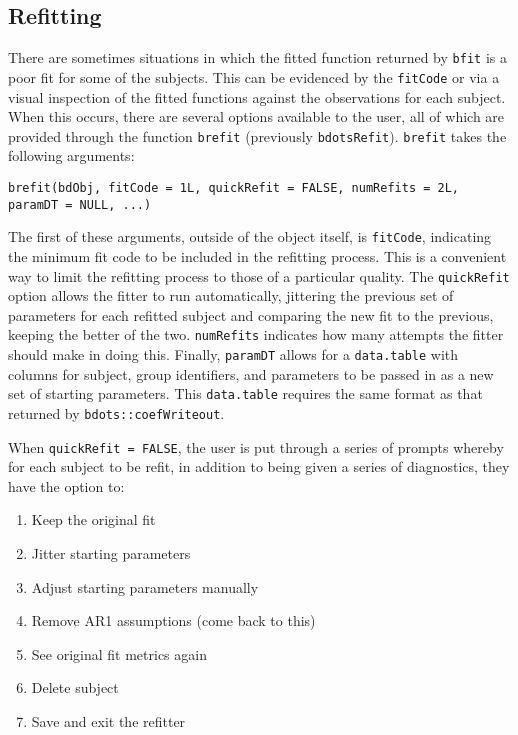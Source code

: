 \documentclass{article}
\begin{document}
\subsection{Refitting}

There are sometimes situations in which the fitted function returned by \texttt{bfit} is a poor fit for some of the subjects. This can be evidenced by the \texttt{fitCode} or via a visual inspection of the fitted functions against the observations for each subject.  When this occurs, there are several options available to the user, all of which are provided through the function \texttt{brefit} (previously \texttt{bdotsRefit}). \texttt{brefit} takes the following arguments:

\begin{center}
\texttt{brefit(bdObj, fitCode = 1L, quickRefit = FALSE, numRefits = 2L, paramDT = NULL, ...)}
\end{center}

The first of these arguments, outside of the object itself, is \texttt{fitCode}, indicating  the minimum fit code to be included in the refitting process. This is a convenient way to limit the refitting process to those of a particular quality. The \texttt{quickRefit} option allows the fitter to run automatically, jittering the previous set of parameters for each refitted subject and comparing the new fit to the previous, keeping the better of the two. \texttt{numRefits} indicates how many attempts the fitter should make in doing this. Finally, \texttt{paramDT} allows for a \texttt{data.table} with columns for subject, group identifiers, and parameters to be passed in as a new set of starting parameters. This \texttt{data.table} requires the same format as that returned by \texttt{bdots::coefWriteout}.

When \texttt{quickRefit = FALSE}, the user is put through a series of prompts whereby for each subject to be refit, in addition to being given a series of diagnostics, they have the option to:

\begin{enumerate}
\item Keep the original fit
\item Jitter starting parameters
\item Adjust starting parameters manually
\item Remove AR1 assumptions (come back to this)
\item See original fit metrics again
\item Delete subject
\item Save and exit the refitter
\end{enumerate}
\end{document}
